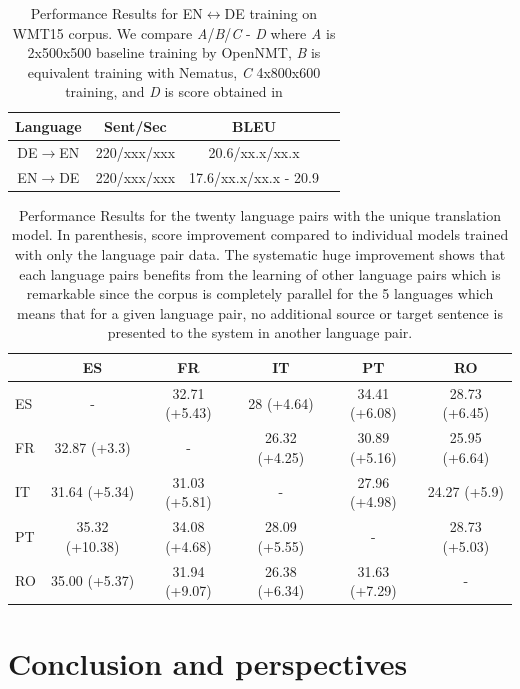 \documentclass[11pt]{article}
\begin{document}
\begin{table}
 \small
  \centering
  \begin{tabular}{cccc}
    \toprule
     Language & Sent/Sec & BLEU \\
    \midrule
    DE$\rightarrow$EN& 220/xxx/xxx & 20.6/xx.x/xx.x\\
    \midrule
    EN$\rightarrow$DE& 220/xxx/xxx & 17.6/xx.x/xx.x - 20.9\\
    \bottomrule
  \end{tabular}
  \label{tab:res}
  \caption{Performance Results for EN$\leftrightarrow$DE training on WMT15 corpus. We compare {\it A}/{\it B}/{\it C} - {\it D} where {\it A} is 2x500x500 baseline training by OpenNMT, {\it B} is equivalent training with Nematus, {\it C} 4x800x600 training, and {\it D} is score obtained in \cite{Luong2015}}
\end{table}

\begin{table}
  \small \centering
  \begin{tabular}{lccccc}
    \toprule
          & ES & FR & IT & PT & RO \\
    \midrule
ES	& - & 32.71 (+5.43)	 & 28 (+4.64) & 34.41 (+6.08) & 28.73 (+6.45) \\ 
FR	& 32.87 (+3.3)	& -  & 26.32 (+4.25)	 & 30.89 (+5.16) & 25.95 (+6.64) \\
IT     & 31.64 (+5.34)	 & 31.03 (+5.81) & - & 27.96 (+4.98) & 24.27 (+5.9) \\
PT	& 35.32 (+10.38) & 34.08 (+4.68) & 28.09 (+5.55) & - & 28.73 (+5.03)\\
RO	& 35.00 (+5.37) & 31.94 (+9.07) & 26.38 (+6.34) & 31.63 (+7.29) & -\\
    \bottomrule
  \end{tabular}
  \label{tab:esfritptro}
  \caption{Performance Results for the twenty language pairs with the unique translation model. In parenthesis, score improvement compared to individual models trained with only the language pair data. The systematic huge improvement shows that each language pairs benefits from the learning of other language pairs which is remarkable since the corpus is completely parallel for the 5 languages which means that for a given language pair, no additional source or target sentence is presented to the system in another language pair.}
\end{table}


\section{Conclusion and perspectives}



\end{document}
